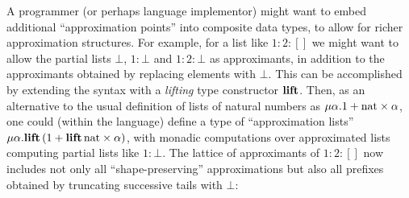 A programmer (or perhaps language implementor) might want to embed additional ``approximation points'' into
composite data types, to allow for richer approximation structures. For example, for a list like $1 : 2 : []$
we might want to allow the partial lists $\bot$, $1 : \bot$ and $1 : 2 : \bot$ as approximants, in addition to
the approximants obtained by replacing elements with $\bot$. This can be accomplished by extending the syntax
with a \emph{lifting} type constructor $\mathbf{lift}$. Then, as an alternative to the usual definition of lists of
natural numbers as $\mu\alpha.1 + \mathrm{nat} \times \alpha$, one could (within the language) define a type
of ``approximation lists'' $\mu\alpha.\mathbf{lift}\,(1 + \mathbf{lift}\,\mathrm{nat} \times \alpha)$, with monadic
computations over approximated lists computing partial lists like $1 : \bot$. The lattice of approximants of
$1 : 2 : []$ now includes not only all ``shape-preserving'' approximations but also all prefixes obtained by
truncating successive tails with $\bot$:

  \begin{center}
    \tikzset{node distance=1cm}
  \end{center}

